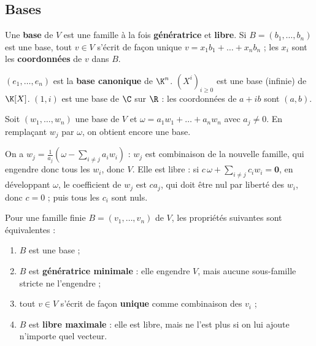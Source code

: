 \subsection{Bases}
\begin{definition}\label{def-base}
Une \textbf{base} de $V$ est une famille à la fois \textbf{génératrice} et \textbf{libre}. Si $B=(b_1,\dots,b_n)$ est une base, tout $v\in V$ s'écrit de façon unique $v=x_1b_1+\dots+x_nb_n$ ; les $x_i$ sont les \textbf{coordonnées} de $v$ dans $B$.
\end{definition}
\begin{exemple}
$(e_1,\dots,e_n)$ est la \textbf{base canonique} de $\K^n$. $(X^i)_{i\ge0}$ est une base (infinie) de $\K[X]$. $(1,i)$ est une base de $\C$ sur $\R$ : les coordonnées de $a+ib$ sont $(a,b)$.
\end{exemple}
\begin{lemme}\label{lem-echange}
Soit $(w_1,\dots,w_n)$ une base de $V$ et $\omega=a_1w_1+\dots+a_nw_n$ avec $a_j\neq0$. En remplaçant $w_j$ par $\omega$, on obtient encore une base.
\end{lemme}
\begin{preuve}
On a $w_j=\frac1{a_j}\left(\omega-\sum_{i\neq j}a_iw_i\right)$ : $w_j$ est combinaison de la nouvelle famille, qui engendre donc tous les $w_i$, donc $V$. Elle est libre : si $c\,\omega+\sum_{i\neq j}c_iw_i=\mathbf 0$, en développant $\omega$, le coefficient de $w_j$ est $ca_j$, qui doit être nul par liberté des $w_i$, donc $c=0$ ; puis tous les $c_i$ sont nuls.
\end{preuve}
\begin{theoreme}\label{thm-base}
Pour une famille finie $B=(v_1,\dots,v_n)$ de $V$, les propriétés suivantes sont équivalentes :
\begin{enumerate}
\item $B$ est une base ;
\item $B$ est \textbf{génératrice minimale} : elle engendre $V$, mais aucune sous-famille stricte ne l'engendre ;
\item tout $v\in V$ s'écrit de façon \textbf{unique} comme combinaison des $v_i$ ;
\item $B$ est \textbf{libre maximale} : elle est libre, mais ne l'est plus si on lui ajoute n'importe quel vecteur.
\end{enumerate}
\end{theoreme}
